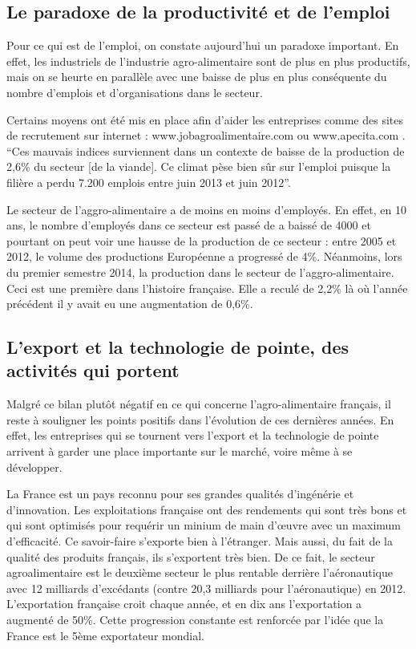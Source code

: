 \documentclass[a4paper,10pt]{report}
\begin{document}
		\subsection{Le paradoxe de la productivité et de l'emploi}
			Pour ce qui est de l’emploi, on constate aujourd'hui un paradoxe important. En effet, les industriels de l’industrie agro-alimentaire sont de plus en plus productifs, mais on se heurte en parallèle avec une baisse de plus en plus conséquente du nombre d’emplois et d’organisations dans le secteur.
			
			Certains moyens ont été mis en place afin d’aider les entreprises comme des sites de recrutement sur internet : www.jobagroalimentaire.com ou www.apecita.com .  “Ces mauvais indices surviennent dans un contexte de baisse de la production de 2,6\% du secteur [de la viande]. Ce climat pèse bien sûr sur l'emploi puisque la filière a perdu 7.200 emplois entre juin 2013 et juin 2012”\cite{DeficitCommercialViandeAggrave}.
			
			Le secteur de l’aggro-alimentaire a de moins en moins d’employés. En effet, en 10 ans, le nombre d’employés dans ce secteur est passé de a baissé de 4000 et pourtant on peut voir une hausse de la production de ce secteur : entre 2005 et 2012, le volume des productions Européenne a progressé de 4\%. Néanmoins, lors du premier semestre 2014, la production dans le secteur de l’aggro-alimentaire. Ceci est une première dans l’histoire française. Elle a reculé de 2,2\% là où l’année précédent il y avait eu une augmentation de 0,6\%.
			

		\subsection{L'export et la technologie de pointe, des activités qui portent}
			Malgré ce bilan plutôt négatif en ce qui concerne l’agro-alimentaire français, il reste à souligner les points positifs dans l’évolution de ces dernières années. En effet, les entreprises qui se tournent vers l’export et la technologie de pointe arrivent à garder une place importante sur le marché, voire même à se développer.
			
			La France est un pays reconnu pour ses grandes qualités d’ingénérie et d’innovation. Les exploitations française ont des rendements qui sont très bons et qui sont optimisés pour requérir un minium de main d'œuvre avec un maximum d’efficacité. Ce savoir-faire s’exporte bien à l’étranger. Mais aussi, du fait de la qualité des produits français, ils s’exportent très bien. De ce fait, le secteur agroalimentaire est le deuxième secteur le plus rentable derrière l’aéronautique avec 12 milliards d’excédants (contre 20,3 milliards pour l’aéronautique) en 2012. L’exportation française croit chaque année, et en dix ans l’exportation a augmenté de 50\%. Cette progression constante est renforcée par l’idée que la France est le 5ème exportateur mondial.
\end{document}
